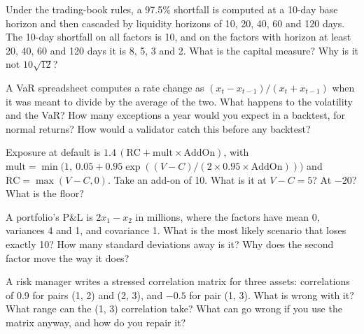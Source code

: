 \begin{question}\label{iq:iv2:risk-validation-and-regulation:32}
Under the trading-book rules, a 97.5\% shortfall is computed at a 10-day base horizon and then cascaded by liquidity horizons of 10, 20, 40, 60 and 120 days. The 10-day shortfall on all factors is 10, and on the factors with horizon at least 20, 40, 60 and 120 days it is 8, 5, 3 and 2. What is the capital measure? Why is it not $10\sqrt{12}$?
\end{question}

\begin{question}\label{iq:iv2:risk-validation-and-regulation:33}
A VaR spreadsheet computes a rate change as $(x_t - x_{t-1})/(x_t + x_{t-1})$ when it was meant to divide by the average of the two. What happens to the volatility and the VaR? How many exceptions a year would you expect in a backtest, for normal returns? How would a validator catch this before any backtest?
\end{question}

\begin{question}\label{iq:iv2:risk-validation-and-regulation:34}
Exposure at default is $1.4\,(\mathrm{RC} + \mathrm{mult} \times \mathrm{AddOn})$, with $\mathrm{mult} = \min\bigl(1,\ 0.05 + 0.95\exp((V - C)/(2 \times 0.95 \times \mathrm{AddOn}))\bigr)$ and $\mathrm{RC} = \max(V - C, 0)$. Take an add-on of 10. What is it at $V - C = 5$? At $-20$? What is the floor?
\end{question}

\begin{question}\label{iq:iv2:risk-validation-and-regulation:35}
A portfolio's P\&L is $2x_1 - x_2$ in millions, where the factors have mean 0, variances 4 and 1, and covariance 1. What is the most likely scenario that loses exactly 10? How many standard deviations away is it? Why does the second factor move the way it does?
\end{question}

\begin{question}\label{iq:iv2:risk-validation-and-regulation:36}
A risk manager writes a stressed correlation matrix for three assets: correlations of 0.9 for pairs (1, 2) and (2, 3), and $-0.5$ for pair (1, 3). What is wrong with it? What range can the (1, 3) correlation take? What can go wrong if you use the matrix anyway, and how do you repair it?
\end{question}

